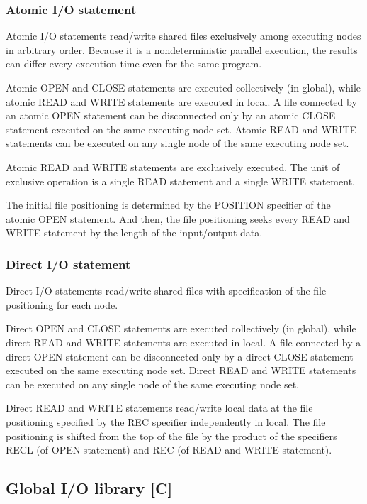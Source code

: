    \subsubsection{Atomic I/O statement}

   Atomic I/O statements read/write shared files exclusively among executing nodes
   in arbitrary order.
   Because it is a nondeterministic parallel execution,
   the results can differ every execution time even for the same program.

   Atomic OPEN and CLOSE statements are executed collectively (in global), while atomic
   READ and WRITE statements are executed in local.
   A file connected by an atomic OPEN statement can be disconnected only by an
   atomic CLOSE statement executed on the same executing node set.
   Atomic READ and WRITE statements can be executed on any single node of the
   same executing node set.

   Atomic READ and WRITE statements are exclusively executed.
   The unit of exclusive operation is a single READ statement and a single WRITE
   statement.

   The initial file positioning is determined by the POSITION specifier of
   the atomic OPEN statement.
   And then, the file positioning seeks every READ and WRITE statement 
   by the length of the input/output data.


   \subsubsection{Direct I/O statement}

   Direct I/O statements read/write shared files with specification of the
   file positioning for each node.

   Direct OPEN and CLOSE statements are executed collectively (in global), while direct
   READ and WRITE statements are executed in local.
   A file connected by a direct OPEN statement can be disconnected only by a
   direct CLOSE statement executed on the same executing node set.
   Direct READ and WRITE statements can be executed on any single node of the
   same executing node set.
   
   Direct READ and WRITE statements read/write local data at the file positioning
   specified by the REC specifier independently in local.
   The file positioning is shifted from the top of the file by the product 
   of the specifiers RECL (of OPEN statement) and
   REC (of READ and WRITE statement). 


   \subsection{Global I/O library [C]}

